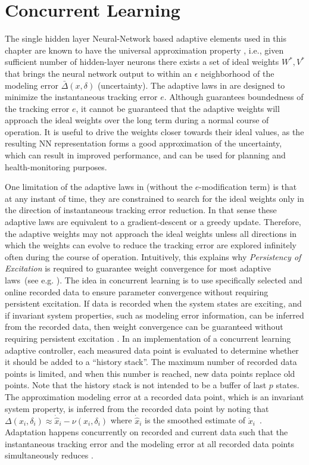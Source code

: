 
\section{Concurrent Learning}\label{s:conc}
The single hidden layer Neural-Network based adaptive elements used in this chapter are known to have the universal approximation property \cite{Haykin:98bk,hornik:itnn:1989}, i.e., given sufficient number of hidden-layer neurons there exists a set of ideal weights $W^*,V^*$ that brings the neural network output to within an $\epsilon$ neighborhood of the modeling error $\bar \Delta(x,\delta)$ (uncertainty). The adaptive laws in  are designed to minimize the instantaneous tracking error $e$. Although  guarantees boundedness of the tracking error $e$, it cannot be guaranteed that the adaptive weights will approach the ideal weights over the long term during a normal course of operation. It is useful to drive the weights closer towards their ideal values, as the resulting NN representation forms a good approximation of the uncertainty, which can result in improved performance, and can be used for planning and health-monitoring purposes.

One limitation of the adaptive laws in  (without the $e$-modification term) is that at any instant of time, they are constrained to search for the ideal weights only in the direction of instantaneous tracking error reduction. In that sense these adaptive laws are equivalent to a gradient-descent or a greedy update. Therefore, the adaptive weights may not approach the ideal weights unless all directions in which the weights can evolve to reduce the tracking error are explored infinitely often during the course of operation. Intuitively, this explains why \emph{Persistency of Excitation} is required to guarantee weight convergence for most adaptive laws~(see e.g. \cite{boyd:automatica:86}). The idea in concurrent learning is to use specifically selected and online recorded data to ensure parameter convergence without requiring persistent excitation. If data is recorded when the system states are exciting, and if invariant system properties, such as modeling error information, can be inferred from the recorded data, then weight convergence can be guaranteed without requiring persistent excitation \cite{Chowdhary:phd:2010}. In an implementation of a concurrent learning adaptive controller, each measured data point is evaluated to determine whether it should be added to a ``history stack''. The maximum number of recorded data points is limited, and when this number is reached, new data points replace old points. Note that the history stack is not intended to be a buffer of last $p$ states. The approximation modeling error at a recorded data point, which is an invariant system property, is inferred from the recorded data point by noting that $\Delta(x_i,\delta_i)\approx\dot{\hat x}_i-\nu(x_i,\delta_i)$ where $\dot{\hat x}_i$ is the smoothed estimate of $\dot{x}_i$~\cite{Chowdhary:JGCD:10,Gelb:74bk}.  Adaptation happens concurrently on recorded and current data such that the instantaneous tracking error and the modeling error at all recorded data points simultaneously reduces \cite{Chowdhary:JGCD:10,Chowdhary:phd:2010,Chowdhary:CDC:10}.

